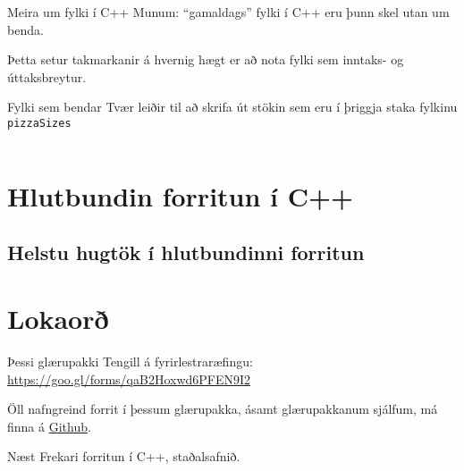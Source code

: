 \documentclass[handout]{beamer}
\begin{document}
\begin{frame}{Meira um fylki í C++}
Munum: ``gamaldags'' fylki í C++ eru þunn skel utan um benda.

Þetta setur takmarkanir á hvernig hægt er að nota fylki sem inntaks- og úttaksbreytur.
\end{frame}

\begin{frame}{Fylki sem bendar}
Tvær leiðir til að skrifa út stökin sem eru í þriggja staka fylkinu \texttt{pizzaSizes}
\begin{columns}
\end{columns}
\end{frame}

\section{Hlutbundin forritun í C++}



\subsection{Helstu hugtök í hlutbundinni forritun}




\section{Lokaorð}

\begin{frame}{Þessi glærupakki}
Tengill á fyrirlestraræfingu: \url{https://goo.gl/forms/qaB2Hoxwd6PFEN9I2}
\vspace{1cm}

Öll nafngreind forrit í þessum glærupakka, ásamt glærupakkanum sjálfum, má finna á  \href{https://github.com/Ernir/kennsluefni/tree/master/T2/Code/w1}{Github}.

\end{frame}


\begin{frame}{Næst}
Frekari forritun í C++, staðalsafnið.
\end{frame}
\end{document}
